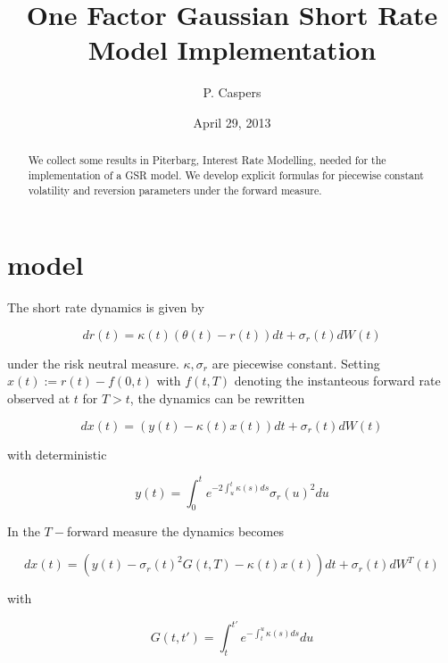 \documentclass{amsart}
\theoremstyle{plain}
\numberwithin{equation}{section}
\begin{document}

\title[One Factor Gaussian Short Rate Model Implementation]{One Factor Gaussian Short Rate Model Implementation}
\author{P. Caspers}
\date{April 29, 2013}
\begin{abstract}
We collect some results in Piterbarg, Interest Rate Modelling, needed for the implementation of a GSR model. We develop explicit formulas
for piecewise constant volatility and reversion parameters under the forward measure.
\end{abstract}

\maketitle


\section{model}
The short rate dynamics is given by

\begin{equation}
dr(t) = \kappa(t) ( \theta(t) - r(t) ) dt + \sigma_r(t) dW(t)
\end{equation}

under the risk neutral measure. $\kappa, \sigma_r$ are piecewise constant. Setting $x(t) := r(t) - f(0,t)$ with $f(t,T)$ denoting
the instanteous forward rate observed at $t$ for $T>t$, the dynamics can be rewritten

\begin{equation}
dx(t) = ( y(t) - \kappa(t) x(t) ) dt + \sigma_r(t) dW(t)
\end{equation}

with deterministic

\begin{equation}\label{smallY}
y(t) = \int_0^t e^{-2 \int_u^t \kappa(s) ds} \sigma_r(u)^2 du
\end{equation}

In the $T-$forward measure the dynamics becomes

\begin{equation}
dx(t) = (y(t)-\sigma_r(t)^2G(t,T)-\kappa(t)x(t))dt+\sigma_r(t)dW^T(t)
\end{equation}

with

\begin{equation}\label{bigG}
G(t,t') = \int_t^{t'} e^{-\int_t^u\kappa(s)ds} du
\end{equation}
\end{document}
